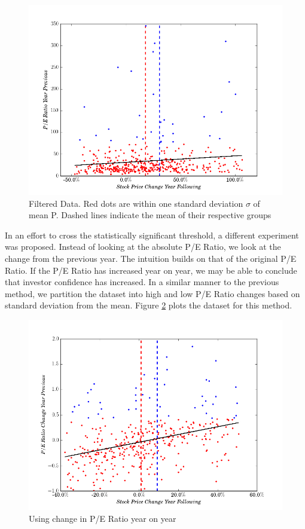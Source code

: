 \documentclass{report}
\begin{document}
\begin{figure}
\caption{Filtered Data. Red dots are within one standard deviation $\sigma $ of mean P. Dashed lines indicate the mean of their respective groups}
\centerline{\includegraphics[width=\textwidth]{../work/fundamentals/absolute_pe_ratio_returns_clean.png}}
\label{fig:pe-absolute-clean}
\end{figure}

In an effort to cross the statistically significant threshold, a different experiment was proposed. Instead of looking at the absolute P/E Ratio, we look at the change from the previous year. The intuition builds on that of the original P/E Ratio. If the P/E Ratio has increased year on year, we may be able to conclude that investor confidence has increased. In a similar manner to the previous method, we partition the dataset into high and low P/E Ratio changes based on standard deviation from the mean. Figure \ref{fig:pe-delta} plots the dataset for this method. 

\begin{figure}
\caption{Using change in P/E Ratio year on year}
\centerline{\includegraphics[width=\textwidth]{../work/fundamentals/delta_pe_ratio_returns_clean.png}}
\label{fig:pe-delta}
\end{figure}
\end{document}
